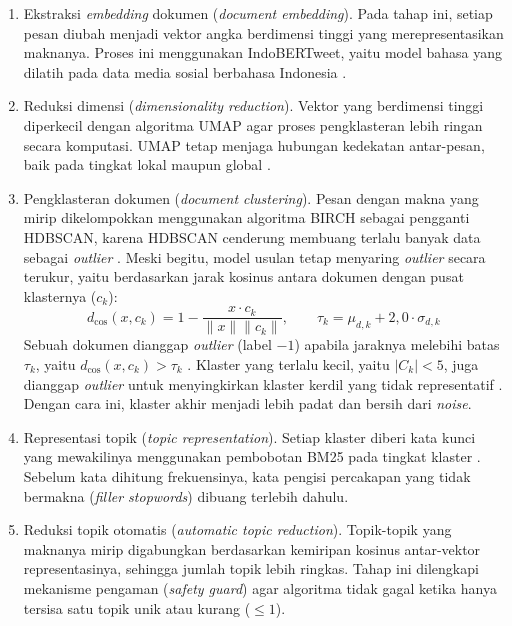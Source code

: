 \begin{enumerate}[label=\alph*., leftmargin=*, itemsep=3pt]
	\item Ekstraksi \textit{embedding} dokumen (\textit{document embedding}). Pada tahap ini, setiap pesan diubah menjadi vektor angka berdimensi tinggi yang merepresentasikan maknanya. Proses ini menggunakan IndoBERTweet, yaitu model bahasa yang dilatih pada data media sosial berbahasa Indonesia \citep{koto2021indobertweet}.
	\item Reduksi dimensi (\textit{dimensionality reduction}). Vektor yang berdimensi tinggi diperkecil dengan algoritma UMAP agar proses pengklasteran lebih ringan secara komputasi. UMAP tetap menjaga hubungan kedekatan antar-pesan, baik pada tingkat lokal maupun global \citep{mcinnes2018umap}.
	\item Pengklasteran dokumen (\textit{document clustering}). Pesan dengan makna yang mirip dikelompokkan menggunakan algoritma BIRCH \citep{10.1145/235968.233324} sebagai pengganti HDBSCAN, karena HDBSCAN cenderung membuang terlalu banyak data sebagai \textit{outlier} \citep{iaes2025indobert}. Meski begitu, model usulan tetap menyaring \textit{outlier} secara terukur, yaitu berdasarkan jarak kosinus antara dokumen dengan pusat klasternya ($c_k$):
	\begin{equation}
			d_{\cos}(x, c_k) = 1 - \frac{x \cdot c_k}{\lVert x \rVert \lVert c_k \rVert}, \qquad \tau_k = \mu_{d, k} + 2{,}0 \cdot \sigma_{d, k}
	\end{equation}
		Sebuah dokumen dianggap \textit{outlier} (label $-1$) apabila jaraknya melebihi batas $\tau_k$, yaitu $d_{\cos}(x, c_k) > \tau_k$ \citep{iaes2025indobert}. Klaster yang terlalu kecil, yaitu $|C_k| < 5$, juga dianggap \textit{outlier} untuk menyingkirkan klaster kerdil yang tidak representatif \citep{Ramadhani_2020}. Dengan cara ini, klaster akhir menjadi lebih padat dan bersih dari \textit{noise}.
	\item Representasi topik (\textit{topic representation}). Setiap klaster diberi kata kunci yang mewakilinya menggunakan pembobotan BM25 pada tingkat klaster \citep{iaes2025indobert}. Sebelum kata dihitung frekuensinya, kata pengisi percakapan yang tidak bermakna (\textit{filler stopwords}) dibuang terlebih dahulu.
	\item Reduksi topik otomatis (\textit{automatic topic reduction}). Topik-topik yang maknanya mirip digabungkan berdasarkan kemiripan kosinus antar-vektor representasinya, sehingga jumlah topik lebih ringkas. Tahap ini dilengkapi mekanisme pengaman (\textit{safety guard}) agar algoritma tidak gagal ketika hanya tersisa satu topik unik atau kurang ($\le 1$).
\end{enumerate}

